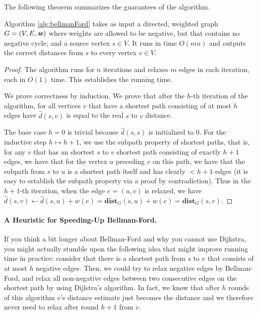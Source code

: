 The following theorem summarizes the guarantees of the algorithm.

\begin{theorem}
Algorithm \ref{alg:bellmanFord} takes as input a directed, weighted graph $G=(V,E, \boldsymbol{\mathit{w}})$ where weights are allowed to be negative, but that contains no negative cycle; and a source vertex $s \in V$. It runs in time $O(mn)$ and outputs the correct distances from $s$ to every vertex $v \in V$. 
\end{theorem}
\begin{proof}
The algorithm runs for $n$ iterations and relaxes $m$ edges in each iteration, each in $O(1)$ time. This establishes the running time.

We prove correctness by induction. We prove that after the $h$-th iteration of the algorithm, for all vertices $v$ that have a shortest path consisting of at most $h$ edges have $\hat{d}(s,v)$ is equal to the real $s$ to $v$ distance.

The base case $h = 0$ is trivial because $\hat{d}(s,s)$ is initialized to $0$. For the inductive step $h \mapsto h+1$, we use the subpath property of shortest paths, that is, for any $v$ that has an shortest $s$ to $v$ shortest path consisting of exactly $h+1$ edges, we have that for the vertex $u$ preceding $v$ on this path, we have that the subpath from $s$ to $u$ is a shortest path itself and has clearly $<h+1$ edges (it is easy to establish the subpath property via a proof by contradiction). Thus in the $h+1$-th iteration, when the edge $e = (u,v)$ is relaxed, we have $\hat{d}(s, v) \gets \hat{d}(s, u) + w(e)= \mathbf{dist}_G(s,u) + w(e) = \mathbf{dist}_G(s,v)$.
\end{proof}

\paragraph{A Heuristic for Speeding-Up Bellman-Ford.} If you think a bit longer about Bellman-Ford and why you cannot use Dijkstra, you might actually stumble upon the following idea that might improve running time in practice: consider that there is a shortest path from $s$ to $v$ that consists of at most $h$ negative edges. Then, we could try to relax negative edges by Bellman-Ford, and relax all non-negative edges between two consecutive edges on the shortest path by using Dijlstra's algorithm.  In fact, we know that after $h$ rounds of this algorithm $v$'s distance estimate just becomes the distance and we therefore never need to relax after round $h+1$ from $v$. 

